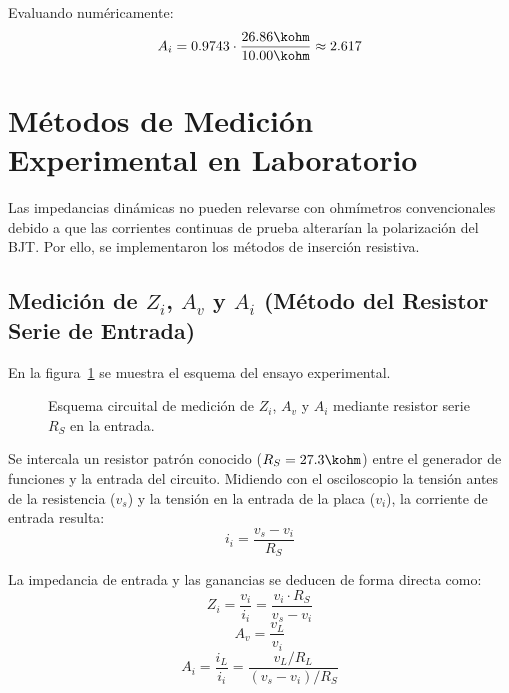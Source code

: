 Evaluando numéricamente:
\begin{equation}
  A_i = 0.9743 \cdot \frac{26.86\kohm}{10.00\kohm} \approx 2.617
  \label{eq:Ai_teorica}
\end{equation}

\section{Métodos de Medición Experimental en Laboratorio}

Las impedancias dinámicas no pueden relevarse con ohmímetros convencionales debido a que las corrientes continuas
de prueba alterarían la polarización del BJT. Por ello, se implementaron los métodos de inserción resistiva.

\subsection{Medición de \texorpdfstring{$Z_i$, $A_v$ y $A_i$}{Zi, Av y Ai} (Método del Resistor Serie de Entrada)}
En la figura~\ref{crkt:medicion_zi} se muestra el esquema del ensayo experimental.

\begin{figure}[!ht]
  \centering
  
  \caption{Esquema circuital de medición de $Z_i$, $A_v$ y $A_i$ mediante resistor serie $R_S$ en la entrada.}
  \label{crkt:medicion_zi}
\end{figure}

Se intercala un resistor patrón conocido ($R_S = 27.3\kohm$) entre el generador de funciones y la entrada del circuito.
Midiendo con el osciloscopio la tensión antes de la resistencia ($v_s$) y la tensión en la entrada de la placa ($v_i$),
la corriente de entrada resulta:
\begin{equation}
  i_i = \frac{v_s - v_i}{R_S}
  \label{eq:ii_exp_formula}
\end{equation}

La impedancia de entrada y las ganancias se deducen de forma directa como:
\begin{equation}
  Z_i = \frac{v_i}{i_i} = \frac{v_i \cdot R_S}{v_s - v_i}
  \label{eq:Zi_exp_formula}
\end{equation}
\begin{equation}
  A_v = \frac{v_L}{v_i}
  \label{eq:Av_exp_formula}
\end{equation}
\begin{equation}
  A_i = \frac{i_L}{i_i} = \frac{v_L / R_L}{(v_s - v_i) / R_S}
  \label{eq:Ai_exp_formula}
\end{equation}


